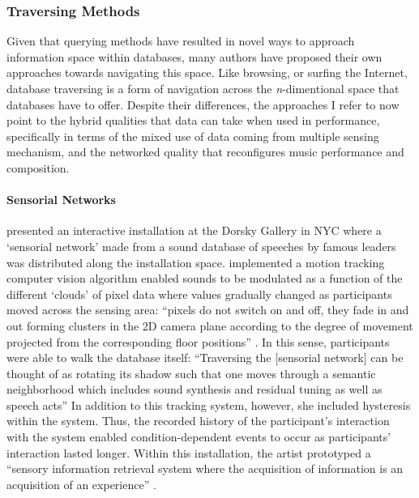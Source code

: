 \subsubsection{Traversing Methods}
{
	Given that querying methods have resulted in novel ways to approach information space within databases, many authors have proposed their own approaches towards navigating this space. Like browsing, or surfing the Internet, database traversing is a form of navigation across the \textit{n}-dimentional space that databases have to offer. Despite their differences, the approaches I refer to now point to the hybrid qualities that data can take when used in performance, specifically in terms of the mixed use of data coming from multiple sensing mechanism, and the networked quality that reconfigures music performance and composition.

	\paragraph{Sensorial Networks}
	\textcite{Cho00:Voi, icmc/bbp2372.2000.146} presented an interactive installation at the Dorsky Gallery in NYC where a `sensorial network' made from a sound database of speeches by famous leaders was distributed along the installation space. \citeauthor{icmc/bbp2372.2000.146} implemented a motion tracking computer vision algorithm enabled sounds to be modulated as a function of the different `clouds' of pixel data where values gradually changed as participants moved across the sensing area: ``pixels do not switch on and off, they fade in and out forming clusters in the 2D camera plane according to the degree of movement projected from the corresponding floor positions'' \parencite[4]{icmc/bbp2372.2000.146}. In this sense, participants were able to walk the database itself: ``Traversing the [sensorial network] can be thought of as rotating its shadow such that one moves through a semantic neighborhood which includes sound synthesis and residual tuning as well as speech acts'' \parencite[3]{icmc/bbp2372.2000.146}	In addition to this tracking system, however, she included hysteresis within the system. Thus, the recorded history of the participant's interaction with the system enabled condition-dependent events to occur as participants' interaction lasted longer. Within this installation, the artist prototyped a ``sensory information retrieval system where the acquisition of information is an acquisition of an experience'' \parencite[1]{icmc/bbp2372.2000.146}.

}
